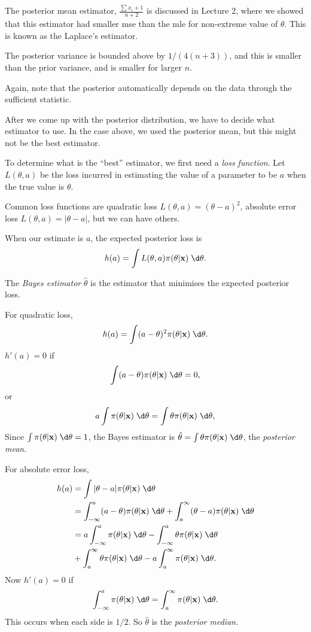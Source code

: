 \documentclass[a4paper]{article}
\begin{document}
The posterior mean estimator, $\frac{\sum x_i + 1}{n + 2}$ is discussed in Lecture 2, where we showed that this estimator had smaller mse than the mle for non-extreme value of $\theta$. This is known as the Laplace's estimator.

The posterior variance is bounded above by $1/(4(n + 3))$, and this is smaller than the prior variance, and is smaller for larger $n$.

Again, note that the posterior automatically depends on the data through the sufficient statistic.

After we come up with the posterior distribution, we have to decide what estimator to use. In the case above, we used the posterior mean, but this might not be the best estimator.

To determine what is the ``best'' estimator, we first need a \emph{loss function}. Let $L(\theta, a)$ be the loss incurred in estimating the value of a parameter to be $a$ when the true value is $\theta$.

Common loss functions are quadratic loss $L(\theta, a) = (\theta - a)^2$, absolute error loss $L(\theta, a) = |\theta - a|$, but we can have others.

When our estimate is $a$, the expected posterior loss is
\[
  h(a) = \int L(\theta, a)\pi(\theta|\mathbf{x})\;\d \theta.
\]
\begin{defi}
  The \emph{Bayes estimator} $\hat{\theta}$ is the estimator that minimises the expected posterior loss.
\end{defi}

For quadratic loss,
\[
  h(a) = \int (a - \theta)^2 \pi(\theta|\mathbf{x})\;\d \theta.
\]
$h'(a) = 0$ if
\[
  \int (a - \theta) \pi(\theta|\mathbf{x})\;\d \theta = 0,
\]
or
\[
  a \int \pi(\theta|\mathbf{x})\;\d \theta = \int \theta \pi(\theta|\mathbf{x})\;\d \theta,
\]
Since $\int \pi (\theta|\mathbf{x})\;\d \theta = 1$, the Bayes estimator is $\hat{\theta} = \int \theta\pi(\theta|\mathbf{x})\;\d \theta$, the \emph{posterior mean}.

For absolute error loss,
\begin{align*}
  h(a) &= \int |\theta - a|\pi(\theta|\mathbf{x})\;\d \theta\\
  &= \int_{-\infty}^a (a - \theta)\pi(\theta|\mathbf{x})\;\d \theta + \int_a^\infty (\theta - a)\pi(\theta|\mathbf{x})\;\d \theta\\
  &= a\int_{-\infty}^a \pi(\theta|\mathbf{x})\;\d \theta - \int_{-\infty}^a\theta\pi(\theta|\mathbf{x})\;\d \theta\\
  &+ \int_a^\infty \theta\pi(\theta|\mathbf{x})\;\d \theta - a\int_a^\infty \pi(\theta|\mathbf{x})\;\d \theta.
\end{align*}
Now $h'(a) = 0$ if
\[
  \int_{-\infty}^a \pi(\theta|\mathbf{x})\;\d \theta = \int_a^\infty \pi(\theta|\mathbf{x})\;\d \theta.
\]
This occurs when each side is $1/2$. So $\hat{\theta}$ is the \emph{posterior median}.
\end{document}
